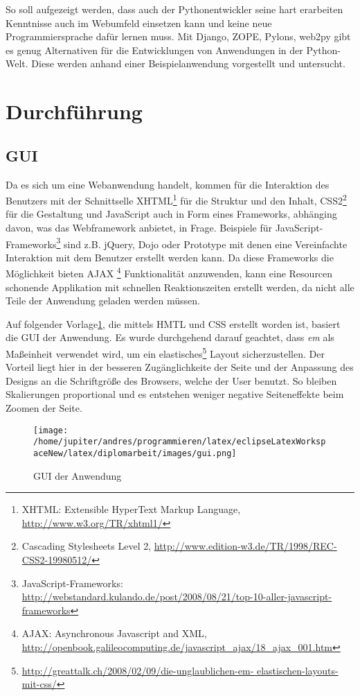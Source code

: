 So soll aufgezeigt werden, dass auch der Pythonentwickler seine hart erarbeiten
Kenntnisse auch im Webumfeld einsetzen kann und keine neue Programmiersprache
dafür lernen muss. Mit Django, ZOPE, Pylons, web2py gibt es genug Alternativen
für die Entwicklungen von Anwendungen in der Python-Welt. Diese werden anhand
einer Beispielanwendung vorgestellt und untersucht.

\section{Durchführung}
\subsection{GUI}
Da es sich um eine Webanwendung handelt, kommen für die Interaktion des
Benutzers mit der Schnittselle XHTML\footnote{XHTML: Extensible
HyperText Markup Language, \url{http://www.w3.org/TR/xhtml1/} } für die
Struktur und den Inhalt, CSS2\footnote{Cascading Stylesheets  Level 2,
\url{http://www.edition-w3.de/TR/1998/REC-CSS2-19980512/}} für die Gestaltung 
und JavaScript auch in Form eines Frameworks, abhänging davon, was das 
Webframework anbietet, in Frage. Beispiele für
JavaScript-Frameworks\footnote{JavaScript-Frameworks:
\url{http://webstandard.kulando.de/post/2008/08/21/top-10-aller-javascript-
frameworks}} sind z.B. jQuery, Dojo oder Prototype mit denen eine Vereinfachte
Interaktion mit dem Benutzer erstellt werden kann. Da diese Frameworks die
Möglichkeit bieten AJAX \footnote{AJAX: Asynchronous 
Javascript and XML,
\url{http://openbook.galileocomputing.de/javascript_ajax/18_ajax_001.htm}}
Funktionalität anzuwenden, kann eine Resourcen schonende Applikation mit
schnellen Reaktionszeiten erstellt werden, da nicht alle Teile der Anwendung 
geladen werden müssen.

Auf folgender Vorlage\ref{guianwendung}, die mittels HMTL und CSS erstellt
worden ist, basiert die GUI der Anwendung. Es wurde durchgehend darauf
geachtet,  dass \emph{em} als Maßeinheit verwendet wird, um ein
elastisches\footnote{\url{http://greattalk.ch/2008/02/09/die-unglaublichen-em-
elastischen-layouts-mit-css/}} Layout sicherzustellen. Der Vorteil liegt hier 
in der besseren Zugänglichkeite der Seite und der Anpassung des Designs an die 
Schriftgröße des Browsers, welche der User benutzt. So bleiben Skalierungen 
proportional und es entstehen weniger negative Seiteneffekte beim Zoomen der
Seite.

\begin{figure}[ht]
 \begin{center}
  \texttt{[image: /home/jupiter/andres/programmieren/latex/eclipseLatexWorkspaceNew/latex/diplomarbeit/images/gui.png]}
 \end{center}
 \caption{GUI der Anwendung}
 \label{guianwendung}
\end{figure}

